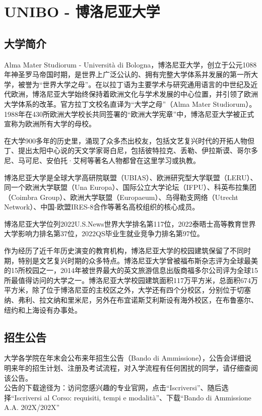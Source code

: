 \chapter{UNIBO - 博洛尼亚大学}    

\section{大学简介}
Alma Mater Studiorum - Università di Bologna，博洛尼亚大学，创立于公元1088年神圣罗马帝国时期，是世界上广泛公认的、拥有完整大学体系并发展的第一所大学，被誉为“世界大学之母”。在以拉丁语为主要学术与研究通用语言的中世纪及近代欧洲，博洛尼亚大学始终保持着欧洲文化与学术发展的中心位置，并引领了欧洲大学体系的改革。官方拉丁文校名直译为“大学之母”（Alma Mater Studiorum）。1988年在430所欧洲大学校长共同签署的“欧洲大学宪章”中，博洛尼亚大学被正式宣称为欧洲所有大学的母校。

在大学900多年的历史里，涌现了众多杰出校友，包括文艺复兴时代的开拓人物但丁、提出太阳中心说的天文学家哥白尼，包括彼特拉克、丢勒、伊拉斯谟、哥尔多尼、马可尼、安伯托·艾柯等著名人物都曾在这里学习或执教。
 
博洛尼亚大学是全球大学高研院联盟（UBIAS）、欧洲研究型大学联盟（LERU）、同一个欧洲大学联盟（Una Europa）、国际公立大学论坛（IFPU）、科英布拉集团（Coimbra Group）、欧洲大学联盟（Europaeum）、乌得勒支网络（Utrecht Network）、中国-欧盟IRES-8合作等著名高校组织的核心成员。

博洛尼亚大学位列2022U.S.News世界大学排名第117位，2022泰晤士高等教育世界大学影响力排名第37位，2022QS毕业生就业竞争力排名第97位。

作为经历了近千年历史演变的教育机构，博洛尼亚大学的校园建筑保留了不同时期，特别是文艺复兴时期的众多特点。博洛尼亚大学曾被福布斯杂志评为全球最美的15所校园之一，2014年被世界最大的英文旅游信息出版商福多尔公司评为全球15所最值得访问的大学之一。博洛尼亚大学校园建筑面积117万平方米，总面积674万平方米，除了位于博洛尼亚的主校区之外，大学还有四个分校区，分别位于切塞纳、弗利、拉文纳和里米尼，另外在布宜诺斯艾利斯设有海外校区，在布鲁塞尔、纽约和上海设有办事处。

\section{招生公告}        

大学各学院在年末会公布来年招生公告（Bando di Ammissione），公告会详细说明来年的招生计划、注册及考试流程，对入学流程有任何困扰的同学，请仔细查阅该公告。\\
公告的下载途径为：访问您感兴趣的专业官网，点击“Iscriversi”、随后选择“Iscriversi al Corso: requisiti, tempi e modalità”、下载“Bando di Ammissione A.A. 202X/202X”


